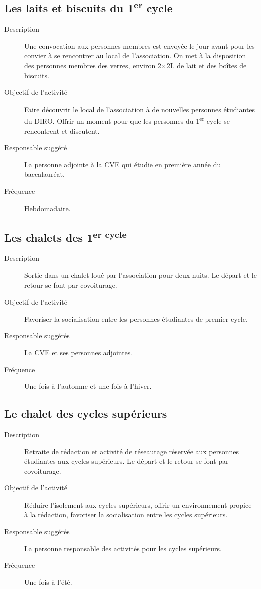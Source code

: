 \documentclass{aediroum}
\begin{document}
\subsection{Les laits et biscuits du 1\textsuperscript{er} cycle}\label{sec:laits-et-biscuits}

\begin{description}
    \item[Description] Une convocation aux personnes membres est envoyée le jour avant pour les convier à se rencontrer au local de l'association. On met à la disposition des personnes membres des verres, environ 2$\times$2L de lait et des boîtes de biscuits.
    \item[Objectif de l'activité] Faire découvrir le local de l'association à de nouvelles personnes étudiantes du DIRO. Offrir un moment pour que les personnes du 1\textsuperscript{er} cycle se rencontrent et discutent.
    \item[Responsable suggéré] La personne adjointe à la CVE qui étudie en première année du baccalauréat.
    \item[Fréquence] Hebdomadaire.
\end{description}

\subsection{Les chalets des 1\textsuperscript{er cycle}}

\begin{description}
    \item[Description] Sortie dans un chalet loué par l’association pour deux nuits. Le départ et le retour se font par covoiturage.
    \item[Objectif de l'activité] Favoriser la socialisation entre les personnes étudiantes de premier cycle.
    \item[Responsable suggérés] La CVE et ses personnes adjointes.
    \item[Fréquence] Une fois à l’automne et une fois à l’hiver.
\end{description}

\subsection{Le chalet des cycles supérieurs}

\begin{description}
    \item[Description] Retraite de rédaction et activité de réseautage réservée aux personnes étudiantes aux cycles supérieurs. Le départ et le retour se font par covoiturage.
    \item[Objectif de l'activité] Réduire l’isolement aux cycles supérieurs, offrir un environnement propice à la rédaction, favoriser la socialisation entre les cycles supérieurs.
    \item[Responsable suggérés] La personne responsable des activités pour les cycles supérieurs.
    \item[Fréquence] Une fois à l’été.
\end{description}
\end{document}

